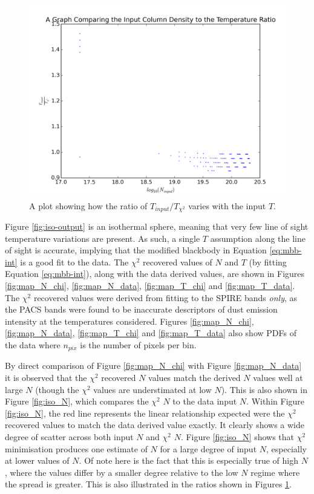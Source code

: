 \documentclass{report}
\begin{document}
\begin{figure}[H]
  \centering
  \includegraphics[width=0.45\linewidth]{../img/sim/T_ratio_inp.png}
  \caption{A plot showing how the ratio of $T_{input}/T_{\chi^{2}}$ varies with the input $T$.}\label{fig:T_ratio}
\end{figure}

Figure \ref{fig:iso-output} is an isothermal sphere, meaning that very few line of sight temperature variations are present. As such, a single $T$ assumption along the line of sight is accurate, implying that the modified blackbody in Equation \ref{eq:mbb-int} is a good fit to the data. The $\chi^{2}$ recovered values of $N$ and $T$ (by fitting Equation \ref{eq:mbb-int}), along with the data derived values, are shown in Figures \ref{fig:map_N_chi}, \ref{fig:map_N_data},
\ref{fig:map_T_chi} and \ref{fig:map_T_data}. The $\chi^{2}$ recovered values were derived from fitting to the SPIRE bands \textit{only}, as the PACS bands were found to be inaccurate descriptors of dust emission intensity at the temperatures considered. Figures \ref{fig:map_N_chi}, \ref{fig:map_N_data},
\ref{fig:map_T_chi} and \ref{fig:map_T_data} also show PDFs of the data where $n_{pix}$ is the number of pixels per bin.

By direct comparison of Figure \ref{fig:map_N_chi} with Figure \ref{fig:map_N_data} it is observed that the $\chi^{2}$ recovered $N$ values match the derived $N$ values well at large $N$ (though the $\chi^{2}$ values are understimated at low $N$). This is also shown in Figure \ref{fig:iso_N}, which compares the $\chi^{2}$ $N$ to the data input
$N$. Within Figure \ref{fig:iso_N}, the red line represents the linear relationship expected were the $\chi^{2}$ recovered values to match the data derived value exactly. It clearly shows a wide degree of scatter across both input
$N$ and $\chi^{2}$ $N$. Figure \ref{fig:iso_N} shows that $\chi^{2}$ minimisation produces one estimate of $N$ for a large degree of input $N$, especially at lower values of $N$. Of note here is the fact that this is especially true of high $N$, where the values differ by a smaller degree relative to the low $N$ regime where the spread is greater. This is also illustrated in the ratios shown in Figures \ref{fig:T_ratio}.
\end{document}
